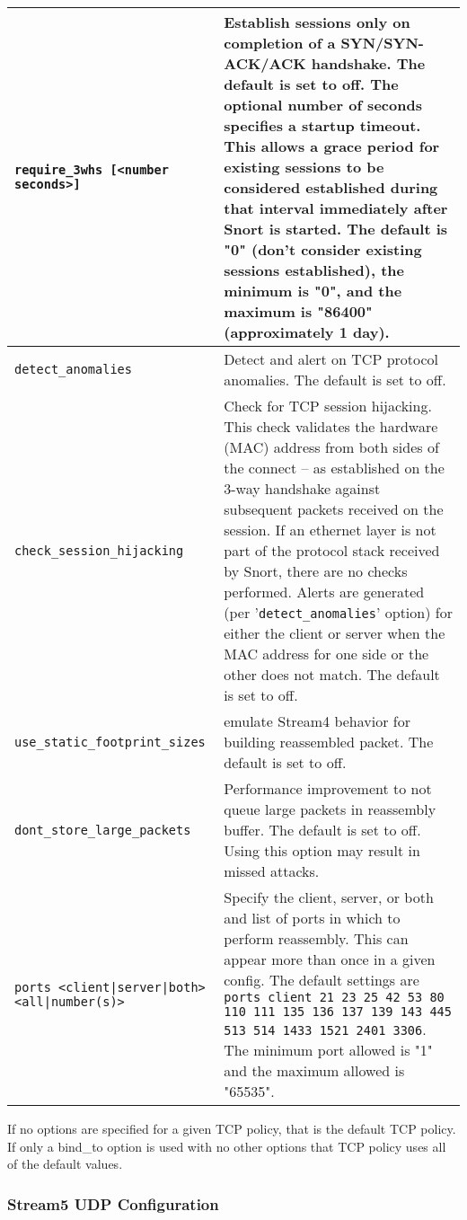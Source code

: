 \documentclass[english]{report}
\newenvironment{note}{
\samepage
    \vspace{10pt}{\textsf{
        {\hspace{7pt}\Huge{$\triangle$\hspace{-12.5pt}{\Large{$^!$}}}}\hspace{5pt}
        {\Large{NOTE}}
    }
    }
   \begin{center}
    \par\vspace{-17pt}

    \begin{lrbox}{\savepar}
    \begin{minipage}[r]{6in}
}
{
    \end{minipage}
    \end{lrbox}
    \fbox{
        \usebox{
            \savepar
	}
    }
    \par\vskip10pt
    \end{center}
}
\newenvironment{note}{
        \begin{rawhtml}
        <p><table border="1"><tr><td><b>
        Note:&nbsp;&nbsp;</b>
        \end{rawhtml}
}{
        \begin{rawhtml}
        </b></td></tr></table></p>
        \end{rawhtml}
}
\begin{document}
\begin{longtable}{| l | p{3.5in} |}
\hline
\texttt{require\_3whs [<number seconds>]} & Establish sessions only on completion of a SYN/SYN-ACK/ACK handshake.  The default is set to off.  The optional number of seconds specifies a startup timeout.  This allows a grace period for existing sessions to be considered established during that interval immediately after Snort is started.  The default is "0" (don't consider existing sessions established), the minimum is "0", and the maximum is "86400" (approximately 1 day).\\
\hline
\texttt{detect\_anomalies} & Detect and alert on TCP protocol anomalies.  The default is set to off.\\
\hline
\texttt{check\_session\_hijacking} & Check for TCP session hijacking.  This check validates the hardware (MAC) address from both sides of the connect -- as established on the 3-way handshake against subsequent packets received on the session.  If an ethernet layer is not part of the protocol stack received by Snort, there are no checks performed.  Alerts are generated (per '\texttt{detect\_anomalies}' option) for either the client or server when the MAC address for one side or the other does not match.  The default is set to off.\\
\hline
\texttt{use\_static\_footprint\_sizes} & emulate Stream4 behavior for building reassembled packet.  The default is set to off.\\
\hline
\texttt{dont\_store\_large\_packets} & Performance improvement to not queue large packets in reassembly buffer.  The default is set to off.  Using this option may result in missed attacks.\\
\hline
\texttt{ports <client|server|both> <all|number(s)>} & 
Specify the client, server, or both and list of ports in which to perform reassembly.  This can appear more than once in a given config.  The default settings are \texttt{ports client 21 23 25 42 53 80 110 111 135 136 137 139 143 445 513 514 1433 1521 2401 3306}.  The minimum port allowed is "1" and the maximum allowed is "65535".\\
\hline
\end{longtable}

\begin{note}
If no options are specified for a given TCP policy, that is the default
TCP policy.  If only a bind\_to option is used with no other options that
TCP policy uses all of the default values.
\end{note}

\subsubsection{Stream5 UDP Configuration}
\end{document}
